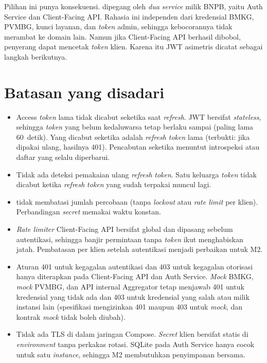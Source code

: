 Pilihan ini punya konsekuensi.  dipegang oleh \emph{dua} \emph{service} milik BNPB, yaitu Auth Service dan
Client-Facing API. Rahasia ini independen dari kredensial BMKG, PVMBG, kunci layanan, dan \emph{token} admin, sehingga kebocorannya
tidak merambat ke domain lain. Namun jika Client-Facing API berhasil dibobol, penyerang dapat mencetak \emph{token} klien. Karena
itu JWT asimetris dicatat sebagai langkah berikutnya.

\section{Batasan yang disadari}\label{sec:p3-batasan}

\begin{itemize}
 \item Access \emph{token} lama tidak dicabut seketika saat \emph{refresh}. JWT bersifat \emph{stateless}, sehingga \emph{token} yang belum kedaluwarsa tetap berlaku sampai  (paling lama 60~detik). Yang dicabut seketika adalah \emph{refresh token} lama (terbukti: jika dipakai ulang, hasilnya 401). Pencabutan seketika menuntut introspeksi atau daftar  yang selalu diperbarui.
 \item Tidak ada deteksi pemakaian ulang \emph{refresh} \emph{token}. Satu keluarga \emph{token} tidak dicabut ketika \emph{refresh} \emph{token} yang sudah terpakai muncul lagi.
 \item {} tidak membatasi jumlah percobaan (tanpa \emph{lockout} atau \emph{rate limit} per klien). Perbandingan \emph{secret} memakai waktu konstan.
 \item \emph{Rate limiter} Client-Facing API bersifat global dan dipasang sebelum autentikasi, sehingga banjir permintaan tanpa \emph{token} ikut menghabiskan jatah. Pembatasan per klien setelah autentikasi menjadi perbaikan untuk M2.
 \item Aturan 401 untuk kegagalan autentikasi dan 403 untuk kegagalan otorisasi hanya diterapkan pada Client-Facing API dan Auth Service. \emph{Mock} BMKG, \emph{mock} PVMBG, dan API internal Aggregator tetap menjawab 401 untuk kredensial yang tidak ada dan 403 untuk kredensial yang salah atau milik instansi lain (spesifikasi mengizinkan 401 maupun 403 untuk \emph{mock}, dan kontrak \emph{mock} tidak boleh diubah).
 \item Tidak ada TLS di dalam jaringan Compose. \emph{Secret} klien bersifat statis di \emph{environment} tanpa perkakas rotasi. SQLite pada Auth Service hanya cocok untuk satu \emph{instance}, sehingga M2 membutuhkan penyimpanan bersama.
\end{itemize}

